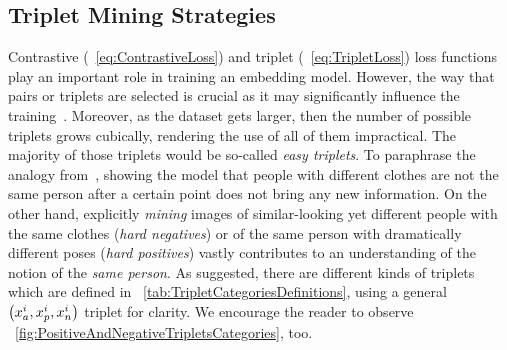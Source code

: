 \subsection{Triplet Mining Strategies}
\label{ssec:TripletMiningStrategies}

Contrastive (\eqtext{}~\ref{eq:ContrastiveLoss}) and triplet (\eqtext{}~\ref{eq:TripletLoss}) loss functions play an important role in training an embedding model. However, the way that pairs or triplets are selected is crucial as it may significantly influence the training~\cite{hermans2017triplet, manmatha2017samplingmatters}. Moreover, as the dataset gets larger, then the number of possible triplets grows cubically, rendering the use of all of them impractical. The majority of those triplets would be so-called \emph{easy triplets}. To paraphrase the analogy from~\cite{hermans2017triplet}, showing the model that people with different clothes are not the same person after a certain point does not bring any new information. On the other hand, explicitly \emph{mining} images of similar-looking yet different people with the same clothes (\emph{hard negatives}) or of the same person with dramatically different poses (\emph{hard positives}) vastly contributes to an understanding of the notion of the \emph{same person}. As suggested, there are different kinds of triplets which are defined in \tabletext{}~\ref{tab:TripletCategoriesDefinitions}, using a general $\left( {x_a^i, x_p^i, x_n^i} \right)$ triplet for clarity. We encourage the reader to observe \figtext{}~\ref{fig:PositiveAndNegativeTripletsCategories}, too.

